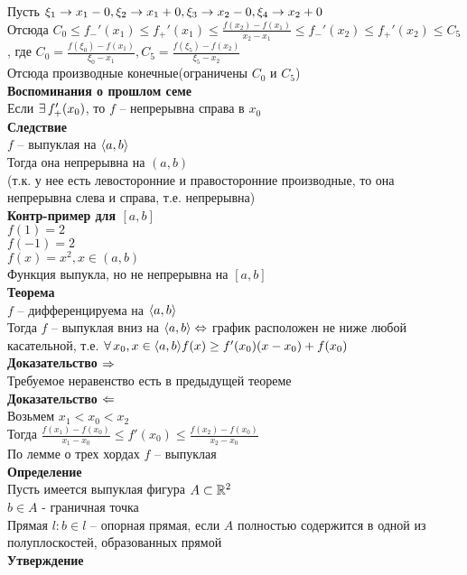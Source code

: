 \documentclass[12pt]{article}
\begin{document}
Пусть $\xi_1 \rightarrow x_1 - 0, \xi_2 \rightarrow x_1 + 0, \xi_3 \rightarrow x_2 - 0, \xi_4 \rightarrow x_2 + 0$\\
Отсюда $C_0 \leq f_-'(x_1) \leq f_+'(x_1) \leq \frac{f(x_2) -f(x_1)}{x_2-x_1} \leq f_-'(x_2) \leq f_+'(x_2) \leq C_5$, где $C_0 = \frac{f(\xi_0)-f(x_1)}{\xi_0-x_1}, C_5 = \frac{f(\xi_5)-f(x_2)}{\xi_5-x_2}$\\
Отсюда производные конечные(ограничены $C_0$ и $C_5$)\\
\textbf{Воспоминания о прошлом семе}\\
Если $\exists\, f_+'(x_0)$, то $f$ -- непрерывна справа в $x_0$\\
\textbf{Следствие}\\
$f$ -- выпуклая на $\langle a, b \rangle$\\
Тогда она непрерывна на $(a,b)$\\
(т.к. у нее есть левосторонние и правосторонние производные, то она непрерывна слева и справа, т.е. непрерывна)\\
\textbf{Контр-пример для $[a,b]$}\\
$f(1) = 2$\\
$f(-1) = 2$\\
$f(x) = x^2, x \in (a,b)$\\
Функция выпукла, но не непрерывна на $[a,b]$\\
\textbf{Теорема}\\
$f$ -- дифференцируема на $\langle a, b \rangle$\\
Тогда $f$ -- выпуклая вниз на $\langle a,b\rangle \Leftrightarrow$ график расположен не ниже любой касательной, т.е. $\forall\, x_0, x \in \langle a,b\rangle f(x) \geq f'(x_0)(x-x_0)+f(x_0)$\\
\textbf{Доказательство $\Rightarrow$}\\
Требуемое неравенство есть в предыдущей теореме\\
\textbf{Доказательство $\Leftarrow$}\\
Возьмем $x_1 < x_0 < x_2$\\
Тогда $\frac{f(x_1)-f(x_0)}{x_1-x_0} \leq f'(x_0) \leq \frac{f(x_2)-f(x_0)}{x_2-x_0}$\\
По лемме о трех хордах $f$ -- выпуклая\\
\textbf{Определение}\\
Пусть имеется выпуклая фигура $A \subset \mathbb{R}^2$\\
$b \in A$ - граничная точка\\
Прямая $l: b \in l$ -- опорная прямая, если $A$ полностью содержится в одной из полуплоскостей, образованных прямой\\
\textbf{Утверждение}\\
\end{document}
